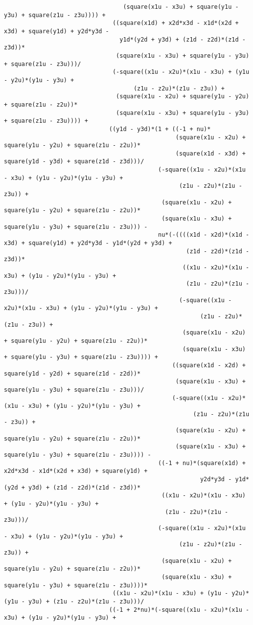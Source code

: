 \begin{lstlisting}
								  (square(x1u - x3u) + square(y1u - y3u) + square(z1u - z3u)))) + 
							   ((square(x1d) + x2d*x3d - x1d*(x2d + x3d) + square(y1d) + y2d*y3d - 
								 y1d*(y2d + y3d) + (z1d - z2d)*(z1d - z3d))*
								(square(x1u - x3u) + square(y1u - y3u) + square(z1u - z3u)))/
							   (-square((x1u - x2u)*(x1u - x3u) + (y1u - y2u)*(y1u - y3u) + 
									 (z1u - z2u)*(z1u - z3u)) + 
								(square(x1u - x2u) + square(y1u - y2u) + square(z1u - z2u))*
								(square(x1u - x3u) + square(y1u - y3u) + square(z1u - z3u)))) + 
							  ((y1d - y3d)*(1 + ((-1 + nu)*
												 (square(x1u - x2u) + square(y1u - y2u) + square(z1u - z2u))*
												 (square(x1d - x3d) + square(y1d - y3d) + square(z1d - z3d)))/
											(-square((x1u - x2u)*(x1u - x3u) + (y1u - y2u)*(y1u - y3u) + 
												  (z1u - z2u)*(z1u - z3u)) + 
											 (square(x1u - x2u) + square(y1u - y2u) + square(z1u - z2u))*
											 (square(x1u - x3u) + square(y1u - y3u) + square(z1u - z3u))) - 
											nu*(-((((x1d - x2d)*(x1d - x3d) + square(y1d) + y2d*y3d - y1d*(y2d + y3d) + 
													(z1d - z2d)*(z1d - z3d))*
												   ((x1u - x2u)*(x1u - x3u) + (y1u - y2u)*(y1u - y3u) + 
													(z1u - z2u)*(z1u - z3u)))/
												  (-square((x1u - x2u)*(x1u - x3u) + (y1u - y2u)*(y1u - y3u) + 
														(z1u - z2u)*(z1u - z3u)) + 
												   (square(x1u - x2u) + square(y1u - y2u) + square(z1u - z2u))*
												   (square(x1u - x3u) + square(y1u - y3u) + square(z1u - z3u)))) + 
												((square(x1d - x2d) + square(y1d - y2d) + square(z1d - z2d))*
												 (square(x1u - x3u) + square(y1u - y3u) + square(z1u - z3u)))/
												(-square((x1u - x2u)*(x1u - x3u) + (y1u - y2u)*(y1u - y3u) + 
													  (z1u - z2u)*(z1u - z3u)) + 
												 (square(x1u - x2u) + square(y1u - y2u) + square(z1u - z2u))*
												 (square(x1u - x3u) + square(y1u - y3u) + square(z1u - z3u)))) - 
											((-1 + nu)*(square(x1d) + x2d*x3d - x1d*(x2d + x3d) + square(y1d) + 
														y2d*y3d - y1d*(y2d + y3d) + (z1d - z2d)*(z1d - z3d))*
											 ((x1u - x2u)*(x1u - x3u) + (y1u - y2u)*(y1u - y3u) + 
											  (z1u - z2u)*(z1u - z3u)))/
											(-square((x1u - x2u)*(x1u - x3u) + (y1u - y2u)*(y1u - y3u) + 
												  (z1u - z2u)*(z1u - z3u)) + 
											 (square(x1u - x2u) + square(y1u - y2u) + square(z1u - z2u))*
											 (square(x1u - x3u) + square(y1u - y3u) + square(z1u - z3u))))*
							   ((x1u - x2u)*(x1u - x3u) + (y1u - y2u)*(y1u - y3u) + (z1u - z2u)*(z1u - z3u)))/
							  ((-1 + 2*nu)*(-square((x1u - x2u)*(x1u - x3u) + (y1u - y2u)*(y1u - y3u) + 

\end{lstlisting}
